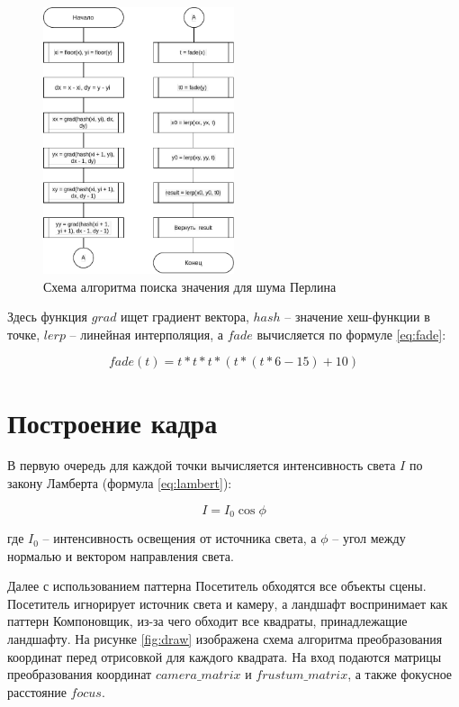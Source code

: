 \begin{figure}[h!]
	\centering
	\includegraphics[width=0.5\textwidth]{tex_parts/perlin.pdf}
	\caption{\label{fig:perlin-scheme}Схема алгоритма поиска значения для шума Перлина}
\end{figure}

Здесь функция $grad$ ищет градиент вектора, $hash$ -- значение хеш-функции в точке, $lerp$ -- линейная интерполяция, а $fade$ вычисляется по формуле \ref{eq:fade}:

\begin{equation}
	\label{eq:fade}
	fade(t) = t * t * t * (t * (t * 6 - 15) + 10)
\end{equation}
 
\section{Построение кадра}

В первую очередь для каждой точки вычисляется интенсивность света $I$ по закону Ламберта (формула \ref{eq:lambert}):

\begin{equation}
	\label{eq:lambert}
	I = I_0 \cos{\phi}
\end{equation}

\noindent где $I_0$ -- интенсивность освещения от источника света, а $\phi$ -- угол между нормалью и вектором направления света.

Далее с использованием паттерна Посетитель обходятся все объекты сцены. Посетитель игнорирует источник света и камеру, а ландшафт воспринимает как паттерн Компоновщик, из-за чего обходит все квадраты, принадлежащие ландшафту. На рисунке \ref{fig:draw} изображена схема алгоритма преобразования координат перед отрисовкой для каждого квадрата. На вход подаются матрицы преобразования координат $camera\_matrix$ и $frustum\_matrix$, а также фокусное расстояние $focus$.


